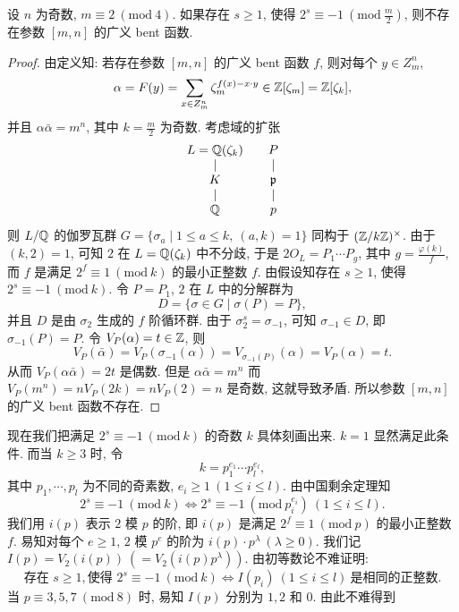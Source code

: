 \begin{theorem}\label{thm:9.25}
设 $n$ 为奇数, $m\equiv 2\ (\mathrm{mod}\ 4)$. 如果存在 $s\geqslant 1$, 使得 $2^s\equiv -1\ (\mathrm{mod}\ \frac{m}{2})$, 则不存在参数 $[m,n]$ 的广义 bent 函数.
\end{theorem}

\begin{proof}
由定义知: 若存在参数 $[m,n]$ 的广义 bent 函数 $f$, 则对每个 $y\in Z_m^n$,
\[
  \alpha=F(y)=\sum_{x\in Z_m^n}\zeta_m^{f(x)-x\cdot y}\in\mathbb{Z}[\zeta_m]=\mathbb{Z}[\zeta_k],
\]
并且 $\alpha\bar{\alpha}=m^n$, 其中 $k=\frac{m}{2}$ 为奇数. 考虑域的扩张
\[
  \begin{array}{ccc}
    L=\mathbb{Q}(\zeta_k) & & P\\
    \mid & & \mid\\
    K & & \mathfrak{p}\\
    \mid & & \mid\\
    \mathbb{Q} & & p
  \end{array}
\]
则 $L/\mathbb{Q}$ 的伽罗瓦群 $G=\{\sigma_a\mid 1\leqslant a\leqslant k,\ (a,k)=1\}$ 同构于 $(\mathbb{Z}/k\mathbb{Z})^{\times}$. 由于 $(k,2)=1$, 可知 $2$ 在 $L=\mathbb{Q}(\zeta_k)$ 中不分歧, 于是 $2O_L=P_1\cdots P_g$, 其中 $g=\frac{\varphi(k)}{f}$, 而 $f$ 是满足 $2^f\equiv 1\ (\mathrm{mod}\ k)$ 的最小正整数 $f$. 由假设知存在 $s\geqslant 1$, 使得 $2^s\equiv -1\ (\mathrm{mod}\ k)$. 令 $P=P_1$, $2$ 在 $L$ 中的分解群为
\[
  D=\{\sigma\in G\mid\sigma(P)=P\},
\]
并且 $D$ 是由 $\sigma_2$ 生成的 $f$ 阶循环群. 由于 $\sigma_2^s=\sigma_{-1}$, 可知 $\sigma_{-1}\in D$, 即 $\sigma_{-1}(P)=P$. 令 $V_P(\alpha)=t\in\mathbb{Z}$, 则
\[
  V_P(\bar{\alpha})=V_P(\sigma_{-1}(\alpha))
  =V_{\sigma_{-1}(P)}(\alpha)=V_P(\alpha)=t.
\]
从而 $V_P(\alpha\bar{\alpha})=2t$ 是偶数. 但是 $\alpha\bar{\alpha}=m^n$ 而 $V_P(m^n)=nV_P(2k)=nV_P(2)=n$ 是奇数, 这就导致矛盾. 所以参数 $[m,n]$ 的广义 bent 函数不存在.
\end{proof}

现在我们把满足 $2^s\equiv -1\ (\mathrm{mod}\ k)$ 的奇数 $k$ 具体刻画出来. $k=1$ 显然满足此条件. 而当 $k\geqslant 3$ 时, 令
\[
  k=p_1^{e_1}\cdots p_l^{e_l},
\]
其中 $p_1,\cdots,p_l$ 为不同的奇素数, $e_i\geqslant 1\ (1\leqslant i\leqslant l)$. 由中国剩余定理知
\begin{equation}\tag{3}
  2^s\equiv -1\ (\mathrm{mod}\ k)
  \Leftrightarrow 2^s\equiv -1\ (\mathrm{mod}\ p_i^{e_i})\ (1\leqslant i\leqslant l).
\end{equation}
我们用 $i(p)$ 表示 $2$ 模 $p$ 的阶, 即 $i(p)$ 是满足 $2^f\equiv 1\ (\mathrm{mod}\ p)$ 的最小正整数 $f$. 易知对每个 $e\geqslant 1$, $2$ 模 $p^e$ 的阶为 $i(p)\cdot p^{\lambda}\ (\lambda\geqslant 0)$. 我们记 $I(p)=V_2(i(p))\ (=V_2(i(p)p^{\lambda}))$. 由初等数论不难证明:
\[
  \text{存在 } s\geqslant 1, \text{使得 } 2^s\equiv -1\ (\mathrm{mod}\ k)
  \Leftrightarrow I(p_i)\ (1\leqslant i\leqslant l)\ \text{是相同的正整数}.
\]
当 $p\equiv 3,5,7\ (\mathrm{mod}\ 8)$ 时, 易知 $I(p)$ 分别为 $1,2$ 和 $0$. 由此不难得到

